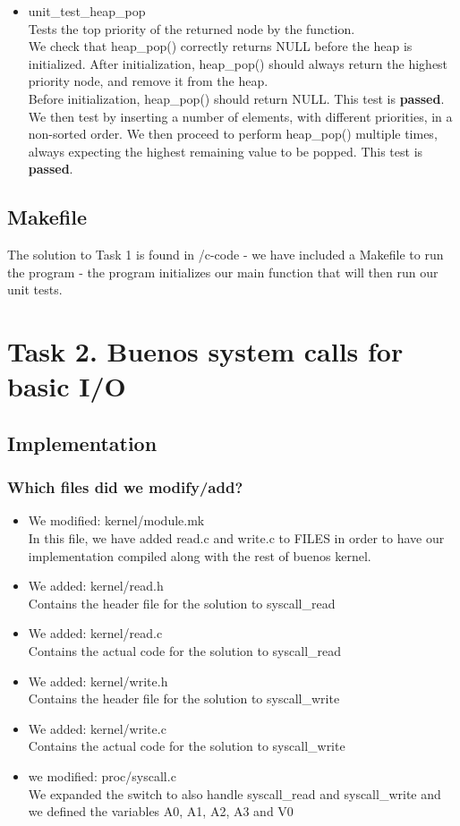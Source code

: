\documentclass[a4paper,12pt,danish]{report}
\begin{document}
\begin{itemize}
  \item{unit\_test\_heap\_pop}
    \\
    Tests the top priority of the returned node by the function.
    \\
    We check that heap\_pop() correctly returns NULL before the heap is initialized. After initialization, heap\_pop() should always return the highest priority node, and remove it from the heap.
    \\
    Before initialization, heap\_pop() should return NULL. This test is \textbf{passed}. We then test by inserting a number of elements, with different priorities, in a non-sorted order. We then proceed to perform heap\_pop() multiple times, always expecting the highest remaining value to be popped. This test is \textbf{passed}.
\end{itemize}
\subsection{Makefile}
The solution to Task 1 is found in /c-code - we have included a Makefile to run the program - the program initializes our main function that will then run our unit tests.
\newpage
\section{Task 2. Buenos system calls for basic I/O}
\subsection{Implementation}
\subsubsection{Which files did we modify/add?}
\begin{itemize}
    \item{We modified: kernel/module.mk}
        \\
        In this file, we have added read.c and write.c to FILES in order to have our implementation compiled along
        with the rest of buenos kernel.
    \item{We added: kernel/read.h}
        \\
        Contains the header file for the solution to syscall\_read
    \item{We added: kernel/read.c}
        \\
        Contains the actual code for the solution to syscall\_read
    \item{We added: kernel/write.h}
        \\
        Contains the header file for the solution to syscall\_write
    \item{We added: kernel/write.c}
        \\
        Contains the actual code for the solution to syscall\_write
    \item{we modified: proc/syscall.c}
        \\
        We expanded the switch to also handle syscall\_read and syscall\_write and we defined the 
        variables A0, A1, A2, A3 and V0
\end{itemize}
\end{document}
